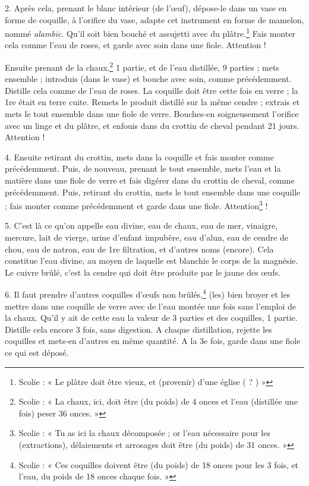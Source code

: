 \documentclass[a4paper, 11pt, oneside, polutonikogreek, french]{article}
\begin{document}
2. Après cela, prenant le blanc intérieur (de l'œuf), dépose-le dans un vase en forme de coquille, à l'orifice du vase, adapte cet instrument en forme de mamelon, nommé \emph{alambic}. Qu'il soit bien bouché et assujetti avec du plâtre.\footnote{Scolie : « Le plâtre doit être vieux, et (provenir) d'une église ( ? ) »} Fais monter cela comme l'eau de roses, et garde avec soin dans une fiole. Attention !

Ensuite prenant de la chaux,\footnote{Scolie : « La chaux, ici, doit être (du poids) de 4 onces et l'eau (distillée une fois) peser 36 onces. »} 1 partie, et de l'eau distillée, 9 parties ; mets ensemble ; introduis (dans le vase) et bouche avec soin, comme précédemment. Distille cela comme de l'eau de roses. La coquille doit être cette fois en verre ; la 1re était en terre cuite. Remets le produit distillé sur la même cendre ; extrais et mets le tout ensemble dans une fiole de verre. Bouches-en soigneusement l'orifice avec un linge et du plâtre, et enfouis dans du crottin de cheval pendant 21 jours. Attention !

4. Ensuite retirant du crottin, mets dans la coquille et fais monter comme précédemment. Puis, de nouveau, prenant le tout ensemble, mets l'eau et la matière dans une fiole de verre et fais digérer dans du crottin de cheval, comme précédemment. Puis, retirant du crottin, mets le tout ensemble dans une coquille ; fais monter comme précédemment et garde dans une fiole. Attention\footnote{Scolie : « Tu as ici la chaux décomposée ; or l'eau nécessaire pour les (extractions), délaiements et arrosages doit être (du poids) de 31 onces. »} !

5. C'est là ce qu'on appelle eau divine, eau de chaux, eau de mer, vinaigre, mercure, lait de vierge, urine d'enfant impubère, eau d'alun, eau de cendre de chou, eau de natron, eau de 1re filtration, et d'autres noms (encore). Cela constitue l'eau divine, au moyen de laquelle est blanchie le corps de la magnésie. Le cuivre brûlé, c'est la cendre qui doit être produite par le jaune des œufs.

6. Il faut prendre d'autres coquilles d'œufs non brûlés,\footnote{Scolie : « Ces coquilles doivent être (du poids) de 18 onces pour les 3 fois, et l'eau, du poids de 18 onces chaque fois. »} (les) bien broyer et les mettre dans une coquille de verre avec de l'eau montée une fois sans l'emploi de la chaux. Qu'il y ait de cette eau la valeur de 3 parties et des coquilles, 1 partie. Distille cela encore 3 fois, sans digestion. A chaque distillation, rejette les coquilles et mets-en d'autres en même quantité. A la 3e fois, garde dans une fiole ce qui est déposé.
\end{document}
